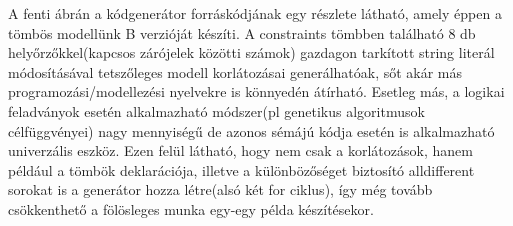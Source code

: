 \documentclass[12pt,a4paper,twoside, openright]{report}
\begin{document}
    A fenti ábrán a kódgenerátor forráskódjának egy részlete látható, amely éppen a tömbös modellünk B verzióját készíti.
    A constraints tömbben található 8 db helyőrzőkkel(kapcsos zárójelek közötti számok) gazdagon tarkított string literál módosításával tetszőleges modell korlátozásai generálhatóak, sőt akár más programozási/modellezési nyelvekre is könnyedén átírható.
    Esetleg más, a logikai feladványok esetén alkalmazható módszer(pl genetikus algoritmusok célfüggvényei) nagy mennyiségű de azonos sémájú kódja esetén is alkalmazható univerzális eszköz.
    Ezen felül látható, hogy nem csak a korlátozások, hanem például a tömbök deklarációja, illetve a különbözőséget biztosító alldifferent sorokat is a generátor hozza létre(alsó két for ciklus), így még tovább csökkenthető a fölösleges munka egy-egy példa készítésekor.
    
    
\end{document}
